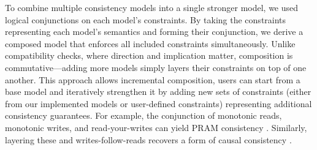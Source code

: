 To combine multiple consistency models into a single stronger model, we used
logical conjunctions on each model's constraints. By taking the constraints
representing each model's semantics and forming their conjunction, we derive a
composed model that enforces all included constraints simultaneously. Unlike
compatibility checks, where direction and implication matter, composition is
commutative—adding more models simply layers their constraints on top of one
another. This approach allows incremental composition, users can start from a
base model and iteratively strengthen it by adding new sets of constraints
(either from our implemented models or user-defined constraints) representing
additional consistency guarantees. For example, the conjunction of monotonic
reads, monotonic writes, and read-your-writes can yield PRAM consistency
\cite{brzezinski2004session}. Similarly, layering these and writes-follow-reads
recovers a form of causal consistency \cite{perrin2016causal}.
